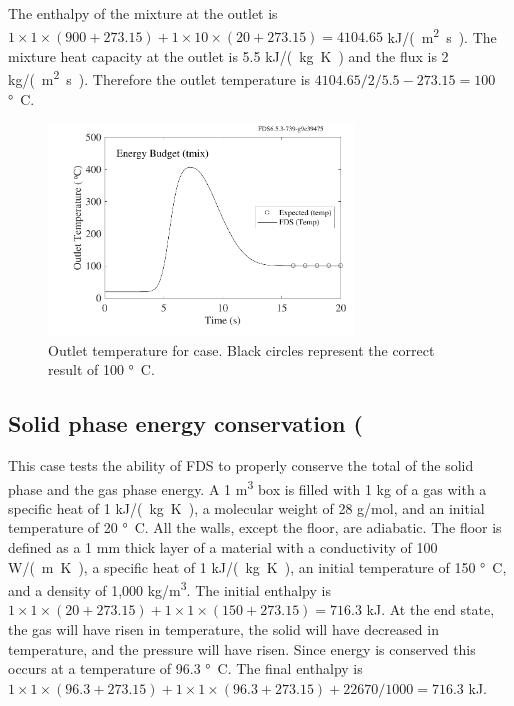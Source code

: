 \documentclass[11pt]{book}
\begin{document}
The enthalpy of the mixture at the outlet is $1 \times 1 \times (900+273.15) + 1 \times 10 \times (20+273.15) = 4104.65$ \si{kJ/(m^2.s)}.  The mixture heat capacity at the outlet is 5.5 \si{kJ/(kg.K)} and the flux is 2 \si{kg/(m^2.s)}.  Therefore the outlet temperature is $4104.65/2/5.5 - 273.15 = 100$ \si{\degree C}.
\begin{figure}[ht]
\centering
\includegraphics[width=3.2in]{SCRIPT_FIGURES/energy_budget_tmix}
\caption[The  test case]{\label{fig_outlet_temperature} Outlet temperature for  case.  Black circles represent the correct result of 100 \si{\degree C}.}
\end{figure}

\clearpage

\subsection{Solid phase energy conservation (\texorpdfstring{})}

This case tests the ability of FDS to properly conserve the total of the solid phase and the gas phase energy.  A 1 \si{m^3} box is filled with 1 kg of a gas with a specific heat of 1 \si{kJ/(kg.K)}, a molecular weight of 28 g/mol, and an initial temperature of 20 \si{\degree C}.  All the walls, except the floor, are adiabatic.  The floor is defined as a 1 mm thick layer of a material with a conductivity of 100 \si{W/(m.K)},  a specific heat of 1 \si{kJ/(kg.K)}, an initial temperature of 150 \si{\degree C}, and a density of 1,000 \si{kg/m^3}.  The initial enthalpy is $1 \times 1 \times (20+273.15) + 1 \times 1 \times (150+273.15)  =  716.3$ kJ.  At the end state, the gas will have risen in temperature, the solid will have decreased in temperature, and the pressure will have risen.  Since energy is conserved this occurs at a temperature of 96.3 \si{\degree C}.  The final enthalpy is $1 \times 1 \times (96.3+273.15) + 1 \times 1 \times (96.3+273.15) + 22670 / 1000  =  716.3$ kJ.
\end{document}
